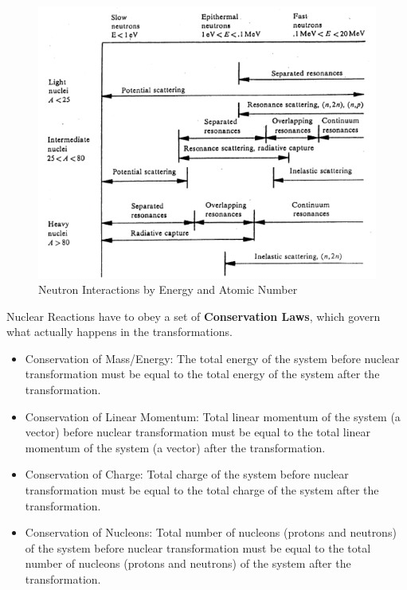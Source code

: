 \documentclass[12pt]{article}
\begin{document}
\begin{figure}[h!]
    \begin{center}
    \includegraphics[keepaspectratio, width = 5 in]{reactionenergy}
    \caption{Neutron Interactions by Energy and Atomic Number}
    \label{fig:phase_space}
    \end{center}
\end{figure}

Nuclear Reactions have to obey a set of \textbf{Conservation Laws}, which govern what actually happens in the transformations. 

\begin{itemize}
\item Conservation of Mass/Energy: The total energy of the system before nuclear transformation must be equal to the total energy of the system after the transformation.

\item Conservation of Linear Momentum: Total linear momentum of the system (a vector) before nuclear transformation must be equal to the total linear momentum of the system (a vector) after the transformation.

\item Conservation of Charge: Total charge of the system before nuclear
transformation must be equal to the total charge of the system after the transformation.

\item Conservation of Nucleons: Total number of nucleons (protons and neutrons) of the system before nuclear transformation must be equal to the total number of nucleons (protons and neutrons) of the system after the transformation.
\end{itemize}
\end{document}
